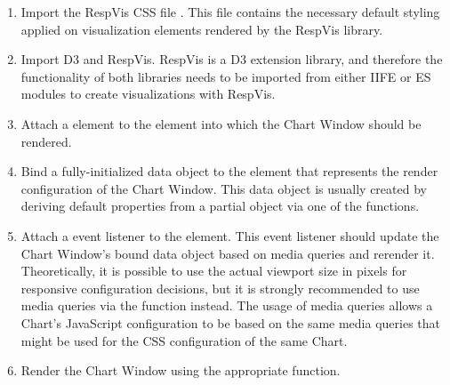 \begin{enumerate}

\item 
Import the RespVis CSS file .
This file contains the necessary default styling applied on visualization elements rendered by the RespVis library.

\item
Import D3 and RespVis.
RespVis is a D3 extension library, and therefore the functionality of both libraries needs to be imported from either IIFE or ES modules to create visualizations with RespVis.

\item
Attach a  element to the element into which the Chart Window should be rendered.

\item
Bind a fully-initialized data object to the  element that represents the render configuration of the Chart Window.
This data object is usually created by deriving default properties from a partial object via one of the  functions.

\item
Attach a  event listener to the  element.
This event listener should update the Chart Window's bound data object based on media queries and rerender it.
Theoretically, it is possible to use the actual viewport size in pixels for responsive configuration decisions, but it is strongly recommended to use media queries via the  function instead.
The usage of media queries allows a Chart's JavaScript configuration to be based on the same media queries that might be used for the CSS configuration of the same Chart.

\item
Render the Chart Window using the appropriate  function.

\begin{samepage}
%
    WIP
  },
]{listings/example-structure.js}
\end{samepage}

\end{enumerate}

